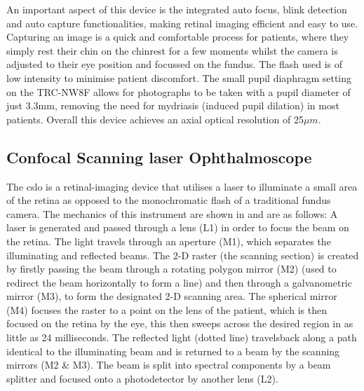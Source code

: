 An important aspect of this device is the integrated auto focus, blink
detection and auto capture functionalities, making retinal imaging
efficient and easy to use. Capturing an image is a quick and comfortable
process for patients, where they simply rest their chin on the chinrest for a
few moments whilst the camera is adjusted to their eye position and
focussed on the fundus. The flash used is of low intensity to minimise
patient discomfort. The small pupil diaphragm setting on the TRC-NW8F
allows for photographs to be
taken with a pupil diameter of just 3.3mm, removing the need for mydriasis
(induced pupil dilation) in most patients. Overall this device achieves
an axial optical resolution of 25$\mu m$.


\subsection{Confocal Scanning \gls{laser} Ophthalmoscope}

The \gls{cslo} is a retinal-imaging device that utilises a \gls{laser} to illuminate a small area of the retina as
opposed to the monochromatic flash of a traditional fundus camera.
The mechanics of this instrument are shown in  and are as
follows: A \gls{laser} is generated and passed through a lens (L1) in order
to focus the beam on the retina. The light travels through an aperture (M1),
which separates the illuminating and reflected beams. The 2-D raster (the
scanning section) is created by firstly passing the beam through a rotating
polygon mirror (M2) (used to redirect the beam horizontally to form a line)
and then through a galvanometric mirror (M3), to form the designated 2-D
scanning area. The spherical mirror (M4) focuses the raster to a point
on the lens of the patient, which is then focused on the retina by the eye,
this then sweeps across the desired region in as little as 24 milliseconds.
The reflected light (dotted line) travelsback along a path identical to the
illuminating beam and is returned to a beam by the scanning mirrors (M2 \&
M3). The beam is split into spectral components by a beam splitter and
focused onto a photodetector by another lens (L2).\cite{webb1987confocal}

